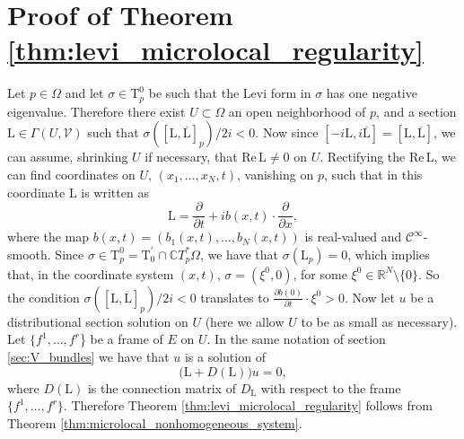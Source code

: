 \documentclass[11pt]{amsart}
\renewcommand{\Re}{\mathrm{Re}\,}
\theoremstyle{definition}
\theoremstyle{remark}
\theoremstyle{plain}
\begin{document}
\section{Proof of Theorem \ref{thm:levi_microlocal_regularity}}
%
%
Let $p \in \Omega$ and let $\sigma \in \mathrm{T}^0_p$ be such that the Levi form in $\sigma$ has one negative eigenvalue. Therefore there exist $U \subset \Omega$ an open neighborhood of $p$, and a section $\mathrm{L} \in \Gamma(U, \mathcal{V})$ such that $\sigma([\mathrm{L}, \overline{\mathrm{L}}]_p)/2i < 0$. Now since $[-i\mathrm{L}, i\overline{\mathrm{L}}] = [\mathrm{L}, \overline{\mathrm{L}}]$, we can assume, shrinking $U$ if necessary, that $\Re \mathrm{L} \neq 0$ on $U$. Rectifying the $\Re \mathrm{L}$, we can find coordinates on $U$, $(x_1, \dots, x_N, t)$, vanishing on $p$, such that in this coordinate $\mathrm{L}$ is written as
%
\begin{equation*}
	\mathrm{L} = \frac{\partial}{\partial t} + i b(x,t)\cdot \frac{\partial}{\partial x},
\end{equation*}
%
where the map $b(x,t) = (b_1(x,t), \dots, b_N(x,t))$ is real-valued and $\mathcal{C}^\infty$-smooth. Since $\sigma \in \mathrm{T}^0_p = \mathrm{T}^\prime_0\cap\mathbb{C}T_p^\ast\Omega$, we have that $\sigma (\mathrm{L}_p) = 0$, which implies that, in the coordinate system $(x,t)$, $ \sigma = (\xi^0, 0)$, for some $\xi^0 \in \mathbb{R}^N \setminus \{0\}$. So the condition $\sigma([\mathrm{L}, \overline{\mathrm{L}}]_p)/2i < 0$ translates to $\frac{\partial b(0)}{\partial t}\cdot \xi^0 > 0$. Now let $u$ be a distributional section solution on $U$ (here we allow $U$ to be as small as necessary). Let $\{f^1, \dots, f^r$\} be a frame of $E$ on $U$. In the same notation of section \ref{sec:V_bundles} we have that $u$ is a solution of
%
\begin{equation*}
	\big(\mathrm{L} + D(\mathrm{L})\big) u = 0, 
\end{equation*}
%
where $D(\mathrm{L})$ is the connection matrix of $D_\mathrm{L}$ with respect to the frame $\{f^1, \dots, f^r\}$. Therefore Theorem \ref{thm:levi_microlocal_regularity} follows from Theorem \ref{thm:microlocal_nonhomogeneous_system}.
\end{document}
